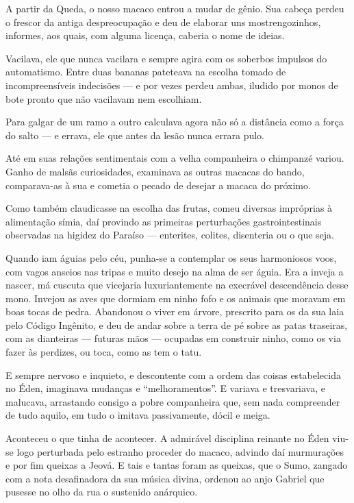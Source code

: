 A partir da Queda, o nosso macaco entrou a mudar de gênio. Sua cabeça
perdeu o frescor da antiga despreocupação e deu de elaborar uns
mostrengozinhos, informes, aos quais, com alguma licença, caberia o nome
de ideias.

Vacilava, ele que nunca vacilara e sempre agira com os soberbos impulsos
do automatismo. Entre duas bananas pateteava na escolha tomado de
incompreensíveis indecisões --- e por vezes perdeu ambas, iludido por
monos de bote pronto que não vacilavam nem escolhiam.

Para galgar de um ramo a outro calculava agora não só a distância como a
força do salto --- e errava, ele que antes da lesão nunca errara pulo.

Até em suas relações sentimentais com a velha companheira o chimpanzé
variou. Ganho de malsãs curiosidades, examinava as outras macacas do
bando, comparava-as à sua e cometia o pecado de desejar a macaca do
próximo.

Como também claudicasse na escolha das frutas, comeu diversas impróprias
à alimentação símia, daí provindo as primeiras perturbações
gastrointestinais observadas na higidez do Paraíso --- enterites,
colites, disenteria ou o que seja.

Quando iam águias pelo céu, punha-se a contemplar os seus harmoniosos
voos, com vagos anseios nas tripas e muito desejo na alma de ser águia.
Era a inveja a nascer, má cuscuta que vicejaria luxuriantemente na
execrável descendência desse mono. Invejou as aves que dormiam em ninho
fofo e os animais que moravam em boas tocas de pedra. Abandonou o viver
em árvore, prescrito para os da sua laia pelo Código Ingênito, e deu de
andar sobre a terra de pé sobre as patas traseiras, com as dianteiras
--- futuras mãos --- ocupadas em construir ninho, como os via fazer às
perdizes, ou toca, como as tem o tatu.

E sempre nervoso e inquieto, e descontente com a ordem das coisas
estabelecida no Éden, imaginava mudanças e ``melhoramentos''. E variava
e tresvariava, e malucava, arrastando consigo a pobre companheira que,
sem nada compreender de tudo aquilo, em tudo o imitava passivamente,
dócil e meiga.

Aconteceu o que tinha de acontecer. A admirável disciplina reinante no
Éden viu-se logo perturbada pelo estranho proceder do macaco, advindo
daí murmurações e por fim queixas a Jeová. E tais e tantas foram as
queixas, que o Sumo, zangado com a nota desafinadora da sua música
divina, ordenou ao anjo Gabriel que pusesse no olho da rua o sustenido
anárquico.

